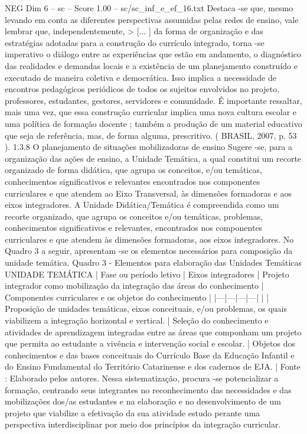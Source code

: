 \begin{textsample}{NEG Dim 6 – sc – Score 1.00 – sc/sc\_inf\_e\_ef\_16.txt}
Destaca -se que, mesmo levando em conta as diferentes perspectivas assumidas pelas redes de ensino, vale lembrar que, independentemente, > [... ] da forma de organização e das estratégias adotadas para a construção do currículo integrado, torna -se imperativo o diálogo entre as experiências que estão em andamento, o diagnóstico das realidades e demandas locais e a existência de um planejamento construído e executado de maneira coletiva e democrática.
Isso implica a necessidade de encontros pedagógicos periódicos de todos os sujeitos envolvidos no projeto, professores, estudantes, gestores, servidores e comunidade.
É importante ressaltar, mais uma vez, que essa construção curricular implica uma nova cultura escolar e uma política de formação docente ; também a produção de um material educativo que seja de referência, mas, de forma alguma, prescritivo. ( BRASIL, 2007, p. 53 ). 1.3.8 O planejamento de situações mobilizadoras de ensino Sugere -se, para a organização das ações de ensino, a Unidade Temática, a qual constitui um recorte organizado de forma didática, que agrupa os conceitos, e/ou temáticas, conhecimentos significativos e relevantes encontrados nos componentes curriculares e que atendem ao Eixo Transversal, às dimensões formadoras e aos eixos integradores.
A Unidade Didática/Temática é compreendida como um recorte organizado, que agrupa os conceitos e/ou temáticas, problemas, conhecimentos significativos e relevantes, encontrados nos componentes curriculares e que atendem às dimensões formadoras, aos eixos integradores.
No Quadro 3 a seguir, apresentam -se os elementos necessários para composição da unidade temática.
Quadro 3 - Elementos para elaboração das Unidades Temáticas UNIDADE TEMÁTICA | Fase ou período letivo | Eixos integradores | Projeto integrador como mobilização da integração das áreas do conhecimento | Componentes curriculares e os objetos do conhecimento | |---|---|---|---| | | Proposição de unidades temáticas, eixos conceituais, e/ou problemas, os quais viabilizem a integração horizontal e vertical. | Seleção do conhecimento e atividades de aprendizagem integradas entre as áreas que componham um projeto que permita ao estudante a vivência e intervenção social e escolar. | Objetos dos conhecimentos e das bases conceituais do Currículo Base da Educação Infantil e do Ensino Fundamental do Território Catarinense e dos cadernos de EJA. | Fonte : Elaborado pelos autores.
Nessa sistematização, procura -se potencializar a formação, centrando seus integrantes no reconhecimento das necessidades e das mobilizações dos/as estudantes e na elaboração e no desenvolvimento de um projeto que viabilize a efetivação da sua atividade estudo perante uma perspectiva interdisciplinar por meio dos princípios da integração curricular.

\end{textsample}
